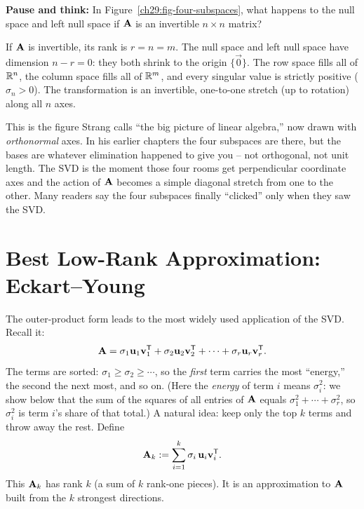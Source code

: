 \begin{recoverybox}
\textbf{Pause and think:} In Figure~\ref{ch29:fig-four-subspaces}, what happens to the null space and left null space if $\mathbf{A}$ is an invertible $n\times n$ matrix?

If $\mathbf{A}$ is invertible, its rank is $r = n = m$. The null space and left null space have dimension $n - r = 0$: they both shrink to the origin $\{\vec{0}\}$. The row space fills all of $\mathbb{R}^n$, the column space fills all of $\mathbb{R}^m$, and every singular value is strictly positive ($\sigma_n > 0$). The transformation is an invertible, one-to-one stretch (up to rotation) along all $n$ axes.
\end{recoverybox}

\begin{strangbox}
This is the figure Strang calls ``the big picture of linear algebra,'' now drawn
with \emph{orthonormal} axes. In his earlier chapters the four subspaces are
there, but the bases are whatever elimination happened to give you -- not
orthogonal, not unit length. The SVD is the moment those four rooms get
perpendicular coordinate axes and the action of $\mathbf{A}$ becomes a simple
diagonal stretch from one to the other. Many readers say the four subspaces
finally ``clicked'' only when they saw the SVD.
\end{strangbox}

\section{Best Low-Rank Approximation: Eckart--Young}
\label{ch29:eckart-young}

The outer-product form leads to the most widely used application of the SVD. Recall it:
\[
  \mathbf{A} = \sigma_1 \mathbf{u}_1\mathbf{v}_1^{\mathsf{T}} + \sigma_2 \mathbf{u}_2\mathbf{v}_2^{\mathsf{T}}
            + \cdots + \sigma_r \mathbf{u}_r\mathbf{v}_r^{\mathsf{T}}.
\]
The terms are sorted: $\sigma_1 \ge \sigma_2 \ge \cdots$, so the \emph{first}
term carries the most ``energy,'' the second the next most, and so on. (Here
the \emph{energy} of term $i$ means $\sigma_i^2$: we show below that the sum of the
squares of all entries of $\mathbf{A}$ equals $\sigma_1^2 + \cdots + \sigma_r^2$, so
$\sigma_i^2$ is term $i$'s share of that total.) A natural
idea: keep only the top $k$ terms and throw away the rest. Define
\[
  \mathbf{A}_k := \sum_{i=1}^{k} \sigma_i\,\mathbf{u}_i\mathbf{v}_i^{\mathsf{T}}.
\]
This $\mathbf{A}_k$ has rank $k$ (a sum of $k$ rank-one pieces). It is an
approximation to $\mathbf{A}$ built from the $k$ strongest directions.

